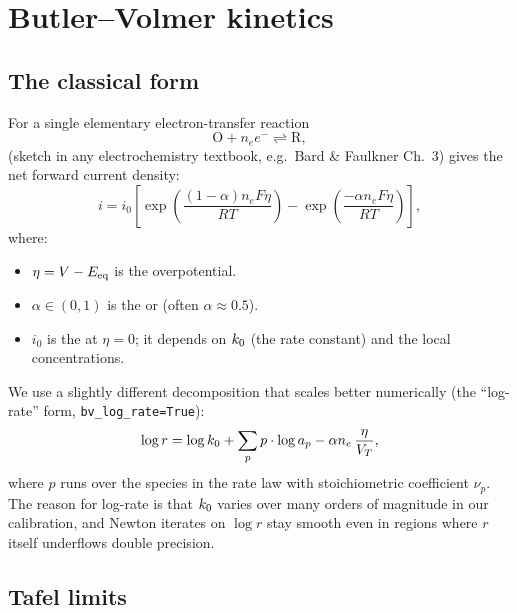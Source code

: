 \documentclass[11pt]{article}
\begin{document}
\section{Butler--Volmer kinetics}

\subsection{The classical form}

For a single elementary electron-transfer reaction
\[
  \mathrm{O} + n_e e^- \rightleftharpoons \mathrm{R},
\]
 (sketch in any electrochemistry
textbook, e.g.\ Bard \& Faulkner Ch.\ 3) gives the net forward
current density:
\begin{equation}
  i = i_0 \left[
       \exp\!\left(\frac{(1-\alpha) n_e F \eta}{RT}\right)
     - \exp\!\left(\frac{-\alpha n_e F \eta}{RT}\right)
  \right],
  \label{eq:bv}
\end{equation}
where:
\begin{itemize}[leftmargin=*]
\item $\eta = V - E_{\mathrm{eq}}$ is the overpotential.
\item $\alpha \in (0,1)$ is the  or
       (often $\alpha \approx 0.5$).
\item $i_0$ is the  at $\eta = 0$;
      it depends on $k_0$ (the rate constant) and the local
      concentrations.
\end{itemize}

We use a slightly different decomposition that scales better
numerically (the ``log-rate'' form, \texttt{bv\_log\_rate=True}):
\begin{equation}
  \log r = \log k_0 + \sum_p p \cdot \log a_p
           - \alpha n_e \, \frac{\eta}{V_T},
  \label{eq:logbv}
\end{equation}
where $p$ runs over the species in the rate law with stoichiometric
coefficient $\nu_p$. The reason for log-rate is that $k_0$ varies
over many orders of magnitude in our calibration, and Newton iterates
on $\log r$ stay smooth even in regions where $r$ itself underflows
double precision.

\subsection{Tafel limits}
\end{document}
